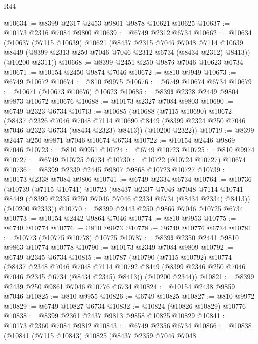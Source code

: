 \begin{lexlean}{R44}
\begin{coremodule}
{@10634 := @8399 @2317 @2453 @9801 @9878 @10621 @10625
@10637 := @10173 @2316 @7084 @9800
@10639 := @6749 @2312 @6734
@10662 := @10634
    (@10637
      (@7115 @10639)
      @10621
      (@8437
        @2315
        @7046
        @7048
        @7114
        @10639
        @8449
        (@8399 @2313 @250 @7046 @7046 @2312 @6734 (@8434 @2312) @8413))
      (@10200 @2311))
@10668 := @8399 @2451 @250 @9876 @7046 @10623 @6734
@10671 := @10154 @2450 @9874 @7046
@10672 := @810 @9949
@10673 := @6749 @10672
@10674 := @810 @9975
@10676 := @6749 @10674 @6734
@10679 := @10671 (@10673 @10676) @10623
@10685 := @8399 @2328 @2449 @9804 @9873 @10672 @10676
@10688 := @10173 @2327 @7084 @9803
@10690 := @6749 @2323 @6734
@10713 := @10685
    (@10688
      (@7115 @10690)
      @10672
      (@8437
        @2326
        @7046
        @7048
        @7114
        @10690
        @8449
        (@8399 @2324 @250 @7046 @7046 @2323 @6734 (@8434 @2323) @8413))
      (@10200 @2322))
@10719 := @8399 @2447 @250 @9871 @7046 @10674 @6734
@10722 := @10154 @2446 @9869 @7046
@10723 := @810 @9951
@10724 := @6749 @10723
@10725 := @810 @9974
@10727 := @6749 @10725 @6734
@10730 := @10722 (@10724 @10727) @10674
@10736 := @8399 @2339 @2445 @9807 @9868 @10723 @10727
@10739 := @10173 @2338 @7084 @9806
@10741 := @6749 @2334 @6734
@10764 := @10736
    (@10739
      (@7115 @10741)
      @10723
      (@8437
        @2337
        @7046
        @7048
        @7114
        @10741
        @8449
        (@8399 @2335 @250 @7046 @7046 @2334 @6734 (@8434 @2334) @8413))
      (@10200 @2333))
@10770 := @8399 @2443 @250 @9866 @7046 @10725 @6734
@10773 := @10154 @2442 @9864 @7046
@10774 := @810 @9953
@10775 := @6749 @10774
@10776 := @810 @9973
@10778 := @6749 @10776 @6734
@10781 := @10773 (@10775 @10778) @10725
@10787 := @8399 @2350 @2441 @9810 @9863 @10774 @10778
@10790 := @10173 @2349 @7084 @9809
@10792 := @6749 @2345 @6734
@10815 := @10787
    (@10790
      (@7115 @10792)
      @10774
      (@8437
        @2348
        @7046
        @7048
        @7114
        @10792
        @8449
        (@8399 @2346 @250 @7046 @7046 @2345 @6734 (@8434 @2345) @8413))
      (@10200 @2344))
@10821 := @8399 @2439 @250 @9861 @7046 @10776 @6734
@10824 := @10154 @2438 @9859 @7046
@10825 := @810 @9955
@10826 := @6749 @10825
@10827 := @810 @9972
@10829 := @6749 @10827 @6734
@10832 := @10824 (@10826 @10829) @10776
@10838 := @8399 @2361 @2437 @9813 @9858 @10825 @10829
@10841 := @10173 @2360 @7084 @9812
@10843 := @6749 @2356 @6734
@10866 := @10838
    (@10841
      (@7115 @10843)
      @10825
      (@8437
        @2359
        @7046
        @7048
}
\end{coremodule}
\end{lexlean}
